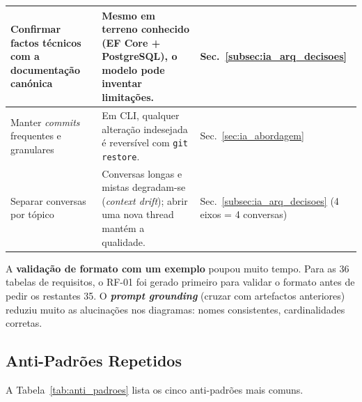 \begin{center}
{\begin{xltabular}{\textwidth}{|>{\raggedright\arraybackslash}p{4cm}|>{\raggedright\arraybackslash}X|>{\raggedright\arraybackslash}p{2.5cm}|}
Confirmar factos técnicos com a documentação canónica & Mesmo em terreno conhecido (EF Core + PostgreSQL), o modelo pode inventar limitações. & Sec.~\ref{subsec:ia_arq_decisoes} \\ \hline

Manter \textit{commits} frequentes e granulares & Em CLI, qualquer alteração indesejada é reversível com \texttt{git restore}. & Sec.~\ref{sec:ia_abordagem} \\ \hline

Separar conversas por tópico & Conversas longas e mistas degradam-se (\textit{context drift}); abrir uma nova thread mantém a qualidade. & Sec.~\ref{subsec:ia_arq_decisoes} (4 eixos = 4 conversas) \\ \hline

\end{xltabular}
}
\end{center}

A \textbf{validação de formato com um exemplo} poupou muito tempo. Para as 36 tabelas de requisitos, o RF-01 foi gerado primeiro para validar o formato antes de pedir os restantes 35. O \textbf{\textit{prompt grounding}} (cruzar com artefactos anteriores) reduziu muito as alucinações nos diagramas: nomes consistentes, cardinalidades corretas.

\subsection{Anti-Padrões Repetidos}\label{subsec:ia_prompts_maus}

A Tabela~\ref{tab:anti_padroes} lista os cinco anti-padrões mais comuns.

